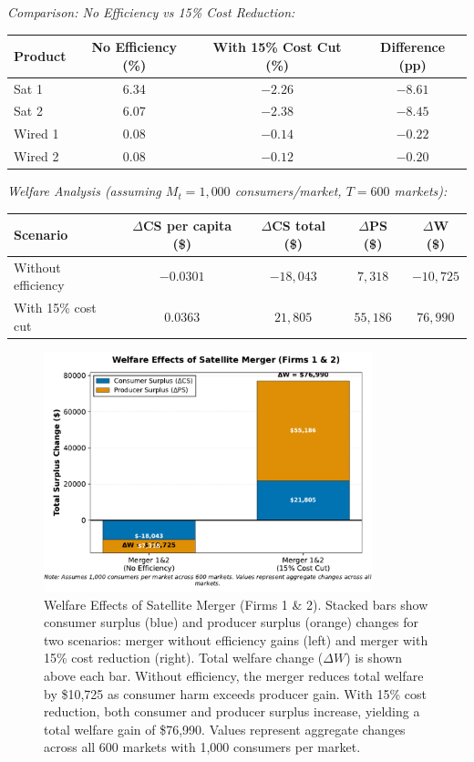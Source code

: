 \documentclass[english,11pt]{article}
\begin{document}
\begin{enumerate}
\textit{Comparison: No Efficiency vs 15\% Cost Reduction:}

\begin{center}
\begin{tabular}{lccc}
\hline
Product & No Efficiency (\%) & With 15\% Cost Cut (\%) & Difference (pp) \\
\hline
Sat 1 & 6.34 & $-2.26$ & $-8.61$ \\
Sat 2 & 6.07 & $-2.38$ & $-8.45$ \\
Wired 1 & 0.08 & $-0.14$ & $-0.22$ \\
Wired 2 & 0.08 & $-0.12$ & $-0.20$ \\
\hline
\end{tabular}
\end{center}

\textit{Welfare Analysis (assuming $M_t = 1{,}000$ consumers/market, $T = 600$ markets):}

\begin{center}
\begin{tabular}{lcccc}
\hline
Scenario & $\Delta$CS per capita (\$) & $\Delta$CS total (\$) & $\Delta$PS (\$) & $\Delta$W (\$) \\
\hline
Without efficiency & $-0.0301$ & $-18{,}043$ & $7{,}318$ & $-10{,}725$ \\
With 15\% cost cut & $0.0363$ & $21{,}805$ & $55{,}186$ & $76{,}990$ \\
\hline
\end{tabular}
\end{center}

\begin{figure}[h]
\centering
\includegraphics[width=0.85\textwidth]{surplus_changes_merger.pdf}
\caption{Welfare Effects of Satellite Merger (Firms 1 \& 2). Stacked bars show consumer surplus (blue) and producer surplus (orange) changes for two scenarios: merger without efficiency gains (left) and merger with 15\% cost reduction (right). Total welfare change ($\Delta W$) is shown above each bar. Without efficiency, the merger reduces total welfare by \$10,725 as consumer harm exceeds producer gain. With 15\% cost reduction, both consumer and producer surplus increase, yielding a total welfare gain of \$76,990. Values represent aggregate changes across all 600 markets with 1,000 consumers per market.}
\label{fig:surplus_changes}
\end{figure}


\end{enumerate}
\end{document}
